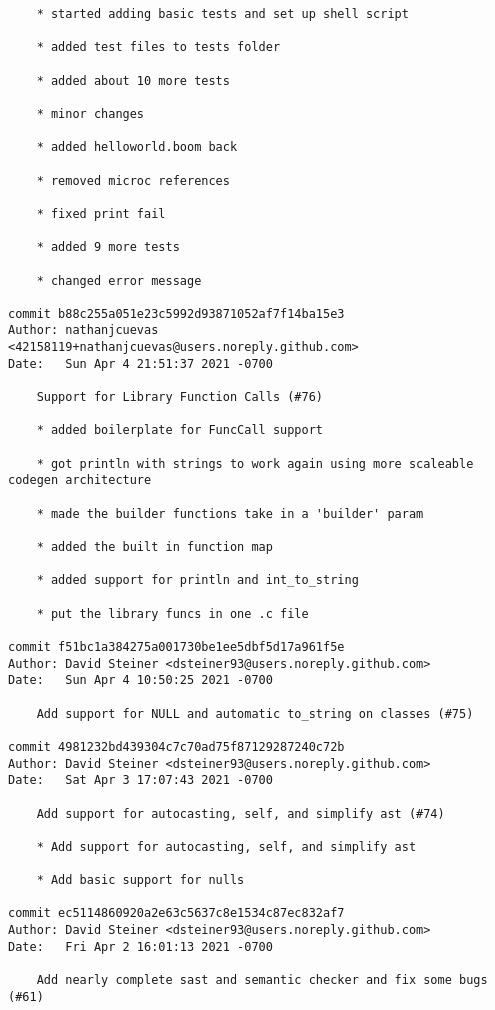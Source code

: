 \documentclass{article}
\begin{document}
\begin{verbatim}
    * started adding basic tests and set up shell script
    
    * added test files to tests folder
    
    * added about 10 more tests
    
    * minor changes
    
    * added helloworld.boom back
    
    * removed microc references
    
    * fixed print fail
    
    * added 9 more tests
    
    * changed error message

commit b88c255a051e23c5992d93871052af7f14ba15e3
Author: nathanjcuevas <42158119+nathanjcuevas@users.noreply.github.com>
Date:   Sun Apr 4 21:51:37 2021 -0700

    Support for Library Function Calls (#76)
    
    * added boilerplate for FuncCall support
    
    * got println with strings to work again using more scaleable codegen architecture
    
    * made the builder functions take in a 'builder' param
    
    * added the built in function map
    
    * added support for println and int_to_string
    
    * put the library funcs in one .c file

commit f51bc1a384275a001730be1ee5dbf5d17a961f5e
Author: David Steiner <dsteiner93@users.noreply.github.com>
Date:   Sun Apr 4 10:50:25 2021 -0700

    Add support for NULL and automatic to_string on classes (#75)

commit 4981232bd439304c7c70ad75f87129287240c72b
Author: David Steiner <dsteiner93@users.noreply.github.com>
Date:   Sat Apr 3 17:07:43 2021 -0700

    Add support for autocasting, self, and simplify ast (#74)
    
    * Add support for autocasting, self, and simplify ast
    
    * Add basic support for nulls

commit ec5114860920a2e63c5637c8e1534c87ec832af7
Author: David Steiner <dsteiner93@users.noreply.github.com>
Date:   Fri Apr 2 16:01:13 2021 -0700

    Add nearly complete sast and semantic checker and fix some bugs (#61)
    

\end{verbatim}
\end{document}
